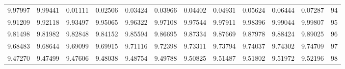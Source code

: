 \begin{center}
\begin{tabular}{|rrrrrrrrrrr|r|}
9.97997&9.99441&0.01111&0.02506&0.03424&0.03966&0.04402&0.04931&0.05624&0.06444&0.07287&94\\[5pt]
9.91209&9.92118&9.93497&9.95065&9.96322&9.97108&9.97544&9.97911&9.98396&9.99044&9.99807&95\\
9.81498&9.81982&9.82848&9.84152&9.85594&9.86695&9.87334&9.87669&9.87978&9.88424&9.89025&96\\
9.68483&9.68644&9.69099&9.69915&9.71116&9.72398&9.73311&9.73794&9.74037&9.74302&9.74709&97\\
9.47270&9.47499&9.47606&9.48038&9.48754&9.49788&9.50825&9.51487&9.51802&9.51972&9.52196&98\\
\hline\end{tabular}
\end{center}
